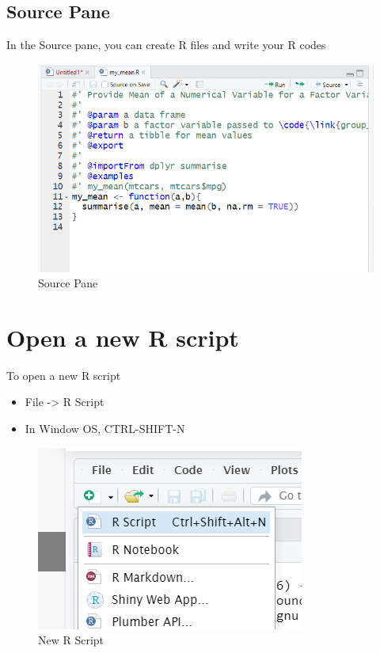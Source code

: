 \documentclass[
]{book}
\providecommand{\tightlist}{%
  \setlength{\itemsep}{0pt}\setlength{\parskip}{0pt}}
\begin{document}
\hypertarget{source-pane}{%
\subsection{Source Pane}\label{source-pane}}

In the Source pane, you can create R files and write your R codes

\begin{figure}
\centering
\includegraphics{source.PNG}
\caption{Source Pane}
\end{figure}

\hypertarget{open-a-new-r-script}{%
\section{Open a new R script}\label{open-a-new-r-script}}

To open a new R script

\begin{itemize}
\tightlist
\item
  File -\textgreater{} R Script
\item
  In Window OS, CTRL-SHIFT-N
\end{itemize}

\begin{figure}
\centering
\includegraphics{Rscript.PNG}
\caption{New R Script}
\end{figure}
\end{document}
